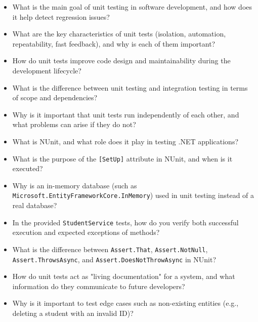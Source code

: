 \begin{itemize}

\item What is the main goal of unit testing in software development, and how does it help detect regression issues?

\item What are the key characteristics of unit tests (isolation, automation, repeatability, fast feedback), and why is each of them important?

\item How do unit tests improve code design and maintainability during the development lifecycle?

\item What is the difference between unit testing and integration testing in terms of scope and dependencies?

\item Why is it important that unit tests run independently of each other, and what problems can arise if they do not?

\item What is NUnit, and what role does it play in testing .NET applications?

\item What is the purpose of the \texttt{[SetUp]} attribute in NUnit, and when is it executed?

\item Why is an in-memory database (such as \texttt{Microsoft.EntityFrameworkCore.InMemory}) used in unit testing instead of a real database?

\item In the provided \texttt{StudentService} tests, how do you verify both successful execution and expected exceptions of methods?

\item What is the difference between \texttt{Assert.That}, \texttt{Assert.NotNull}, \texttt{Assert.ThrowsAsync}, and \texttt{Assert.DoesNotThrowAsync} in NUnit?

\item How do unit tests act as "living documentation" for a system, and what information do they communicate to future developers?

\item Why is it important to test edge cases such as non-existing entities (e.g., deleting a student with an invalid ID)?

\end{itemize}